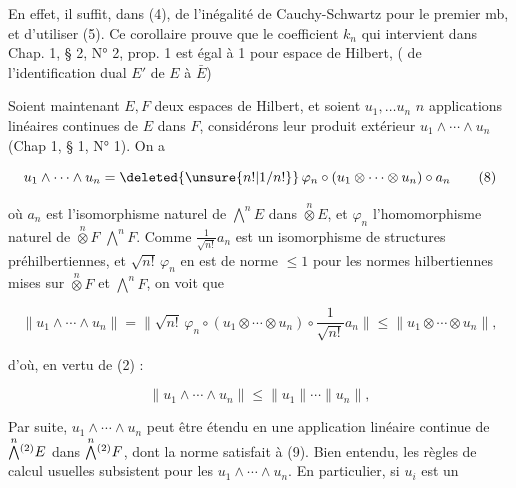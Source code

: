 En effet, il suffit, dans (4), de  l'inégalité de
Cauchy-Schwartz pour le premier mb, et d'utiliser (5).
Ce corollaire prouve que le coefficient $k_n$ qui intervient
dans Chap. 1, § 2, N° 2, prop. 1 est égal à 1 pour   espace de
Hilbert, (  de l'identification  dual $E'$ de $E$ à $\bar E$)

Soient maintenant $E,F$ deux espaces de Hilbert, et
soient $u_1,\ldots u_n$ $n$ applications linéaires continues
de $E$ dans $F$, considérons leur produit extérieur
$u_1\wedge\cdots\wedge u_n$ (Chap 1, § 1, N° 1). On a

\[
u_1\wedge\cdots\wedge u_n=\deleted{\unsure{n!|1/n!}}\,\varphi_n\circ(u_1\otimes\cdots\otimes u_n)\circ a_n \tag*{(8)}
\]

où $a_n$ est l'isomorphisme  naturel de
$\overset{n}{\bigwedge}E$ dans $\overset{n}{\otimes}E$, et $\varphi_n$ l'homomorphisme naturel de
$\overset{n}{\otimes}F$   $\overset{n}{\bigwedge}F$. Comme $\frac1{\sqrt{n!}}a_n$ est \unsure{$=$} un
isomorphisme de structures préhilbertiennes, et $\sqrt{n!}\,\varphi_n$ en est
de norme $\leq1$ pour les normes hilbertiennes mises
sur $\overset{n}{\otimes}F$ et $\overset{n}{\bigwedge}F$, on voit que

\[
\|u_1\wedge\cdots\wedge u_n\|=\|\sqrt{n!}\,\varphi_n\circ(u_1\otimes\cdots\otimes u_n)\circ\frac1{\sqrt{n!}}a_n\|\leq\|u_1\otimes\cdots\otimes u_n\|,
\]

d'où, en vertu de (2) :

\[
\|u_1\wedge\cdots\wedge u_n\|\leq\|u_1\|\cdots\|u_n\|, \tag*{(9)}
\]

Par suite, $u_1\wedge\cdots\wedge u_n$ peut être étendu en
une application linéaire continue de $\overset{n}{\bigwedge}\vphantom{\bigwedge}^{(2)}E$ dans
$\overset{n}{\bigwedge}\vphantom{\bigwedge}^{(2)}F$,  dont la norme satisfait à (9). Bien entendu,
les règles de calcul usuelles subsistent pour les
 $u_1\wedge\cdots\wedge u_n$.  En particulier, si $u_i$ est un


